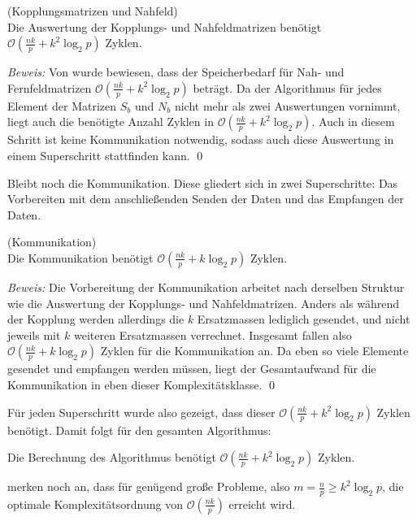   \begin{lem}
  \label{lem:koppl}
    (Kopplungsmatrizen und Nahfeld)\\
    Die Auswertung der Kopplungs- und Nahfeldmatrizen benötigt $\mathcal{O}(\frac{nk}{p} + k^2 \log_2p)$ Zyklen.
  \end{lem}

  \textit{Beweis:}
  Von \citet{distrh2} wurde bewiesen, dass der Speicherbedarf für Nah- und Fernfeldmatrizen $\mathcal{O}(\frac{nk}{p} + k^2 \log_2p)$ beträgt. Da der Algorithmus für jedes Element der Matrizen $S_b$ und
  $N_b$ nicht mehr als zwei Auswertungen vornimmt, liegt auch die benötigte Anzahl Zyklen in $\mathcal{O}(\frac{nk}{p} + k^2 \log_2p)$. Auch in diesem Schritt ist keine Kommunikation notwendig, sodass 
  auch diese Auswertung in einem Superschritt stattfinden kann. \qed
  
  Bleibt noch die Kommunikation. Diese gliedert sich in zwei Superschritte: Das Vorbereiten mit dem anschließenden Senden der Daten und das Empfangen der Daten. 
  
  \begin{lem}
    (Kommunikation)\\
    Die Kommunikation benötigt $\mathcal{O}(\frac{nk}{p} + k \log_2p)$ Zyklen.
  \end{lem}

  \textit{Beweis:}
  Die Vorbereitung der Kommunikation arbeitet nach derselben Struktur wie die Auswertung der Kopplungs- und Nahfeldmatrizen. Anders als während der Kopplung werden allerdings die $k$ Ersatzmassen
  lediglich gesendet, und nicht jeweils mit $k$ weiteren Ersatzmassen verrechnet. Insgesamt fallen also $\mathcal{O}(\frac{nk}{p} + k \log_2p)$ Zyklen für die Kommunikation
  an. Da eben so viele Elemente gesendet und empfangen werden müssen, liegt der Gesamtaufwand für die Kommunikation in eben dieser Komplexitätsklasse. \qed
  
  Für jeden Superschritt wurde also gezeigt, dass dieser $\mathcal{O}(\frac{nk}{p} + k^2 \log_2p)$ Zyklen benötigt. Damit folgt für den gesamten Algorithmus:
  
  \begin{thm}
    Die Berechnung des Algorithmus benötigt $\mathcal{O}(\frac{nk}{p} + k^2 \log_2p)$ Zyklen.
  \end{thm}
  
  \citet{distrh2} merken noch an, dass  für genügend große Probleme, also $m = \frac{n}{p} \geq k^2 \log_2p$, die optimale Komplexitätsordnung von $\mathcal{O}(\frac{nk}{p})$ erreicht wird.
  
